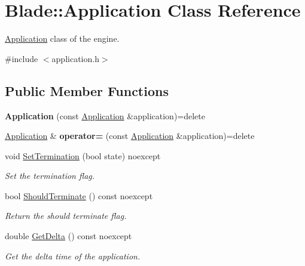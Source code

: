 \hypertarget{class_blade_1_1_application}{}\section{Blade\+:\+:Application Class Reference}
\label{class_blade_1_1_application}


\hyperlink{class_blade_1_1_application}{Application} class of the engine.  




{\ttfamily \#include $<$application.\+h$>$}

\subsection*{Public Member Functions}
\begin{DoxyCompactItemize}
\item 
\mbox{\label{class_blade_1_1_application_a73ea9e8a20297c3dd47a565302e46b10}} 
{\bfseries Application} (const \hyperlink{class_blade_1_1_application}{Application} \&application)=delete
\item 
\mbox{\label{class_blade_1_1_application_ad7528afe280f12aa19f0dcbefd5083aa}} 
\hyperlink{class_blade_1_1_application}{Application} \& {\bfseries operator=} (const \hyperlink{class_blade_1_1_application}{Application} \&application)=delete
\item 
void \hyperlink{class_blade_1_1_application_a74d0bed9493b107ac522db1a40ebe19d}{Set\+Termination} (bool state) noexcept
\begin{DoxyCompactList}\small\item\em Set the termination flag. \end{DoxyCompactList}\item 
bool \hyperlink{class_blade_1_1_application_a68aba5838320ebb7b2683954ffee050b}{Should\+Terminate} () const noexcept
\begin{DoxyCompactList}\small\item\em Return the should terminate flag. \end{DoxyCompactList}\item 
double \hyperlink{class_blade_1_1_application_a8e144f5f05fc638339fc19afe142bbab}{Get\+Delta} () const noexcept
\begin{DoxyCompactList}\small\item\em Get the delta time of the application. \end{DoxyCompactList}\item 

\end{DoxyCompactItemize}
